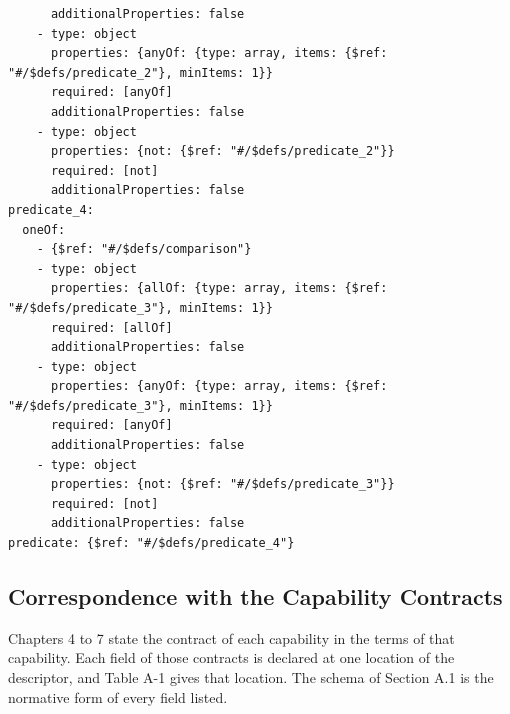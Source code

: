 \begin{verbatim}
      additionalProperties: false
    - type: object
      properties: {anyOf: {type: array, items: {$ref: "#/$defs/predicate_2"}, minItems: 1}}
      required: [anyOf]
      additionalProperties: false
    - type: object
      properties: {not: {$ref: "#/$defs/predicate_2"}}
      required: [not]
      additionalProperties: false
predicate_4:
  oneOf:
    - {$ref: "#/$defs/comparison"}
    - type: object
      properties: {allOf: {type: array, items: {$ref: "#/$defs/predicate_3"}, minItems: 1}}
      required: [allOf]
      additionalProperties: false
    - type: object
      properties: {anyOf: {type: array, items: {$ref: "#/$defs/predicate_3"}, minItems: 1}}
      required: [anyOf]
      additionalProperties: false
    - type: object
      properties: {not: {$ref: "#/$defs/predicate_3"}}
      required: [not]
      additionalProperties: false
predicate: {$ref: "#/$defs/predicate_4"}
\end{verbatim}

\hypertarget{a.2-correspondence-with-the-capability-contracts}{%
\subsection{Correspondence with the Capability Contracts}\label{a.2-correspondence-with-the-capability-contracts}}

Chapters 4 to 7 state the contract of each capability in the terms of
that capability. Each field of those contracts is declared at one
location of the descriptor, and Table A-1 gives that location. The
schema of Section A.1 is the normative form of every field listed.

